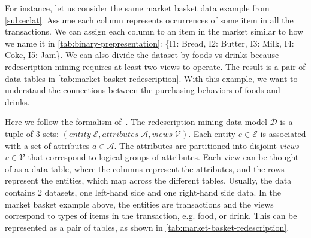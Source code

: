 
For instance, let us consider the same market basket data example from \autoref{sub:eclat}.
Assume each column represents occurrences of some item in all the transactions.
We can assign each column to an item in the market similar to how we name it in \autoref{tab:binary-prepresentation}: \{I1: Bread, I2: Butter, I3: Milk, I4: Coke, I5: Jam\}.
We can also divide the dataset by foods vs drinks because redescription mining requires at least two views to operate.
The result is a pair of data tables in \autoref{tab:market-basket-redescription}.
With this example, we want to understand the connections between the purchasing behaviors of foods and drinks.

Here we follow the formalism of~\cite{Galbrun-Methods}.
The redescription mining data model $\mathcal{D}$ is a tuple of 3 sets: $\left( entity\;\mathcal{E}, attributes\;\mathcal{A}, views\;\mathcal{V} \right)$.
Each entity $e \in \mathcal{E}$ is associated with a set of attributes $a \in \mathcal{A}$.
The attributes are partitioned into disjoint \emph{views} $v \in \mathcal{V}$ that correspond to logical groups of attributes. Each view can be thought of as a data table, where the columns represent the attributes, and the rows represent the entities, which map across the different tables.
Usually, the data contains 2 datasets, one left-hand side and one right-hand side data.
In the market basket example above, the entities are transactions and the views correspond to types of items in the transaction, e.g. food, or drink.
This can be represented as a pair of tables, as shown in \autoref{tab:market-basket-redescription}.

